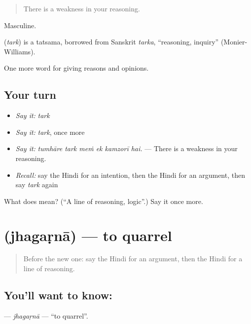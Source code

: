 \begin{quote}
There is a weakness in your reasoning.
\end{quote}

Masculine.

\begin{cousinweb}
\textbf{} (\emph{tark}) is a tatsama, borrowed from Sanskrit \emph{tarka}, \textquotedblleft{}reasoning, inquiry\textquotedblright{} (Monier-Williams).
\end{cousinweb}

\begin{grammarlens}[title={What you've built}]
One more word for giving reasons and opinions.
\end{grammarlens}

\subsection*{Your turn}
\begin{itemize}
\raggedright
  \item \emph{Say it:} \emph{tark}
  \item \emph{Say it:} \emph{tark}, once more
  \item \emph{Say it:} \emph{tumhāre tark meṁ ek kamzorī hai.} — There is a weakness in your reasoning.
  \item \emph{Recall:} say the Hindi for an intention, then the Hindi for an argument, then say \emph{tark} again
\end{itemize}

\begin{tcolorbox}[breakable,colback=teal!4,colframe=teal!35!black,title={Before you move on}]
What does  mean? (\textquotedblleft{}A line of reasoning, logic\textquotedblright{}.) Say it once more.
\end{tcolorbox}
\section[\texorpdfstring{\hi{झगड़ना} (jhagaṛnā)}{झगड़ना (jhagaṛnā)}]{ (jhagaṛnā) — to quarrel}

\label{lesson:HI-C346-jhagarna}



\begin{quote}
Before the new one: say the Hindi for an argument, then the Hindi for a line of reasoning.
\end{quote}

\subsection*{You'll want to know: }
\textbf{} — \emph{jhagaṛnā} — \textquotedblleft{}to quarrel\textquotedblright{}.

